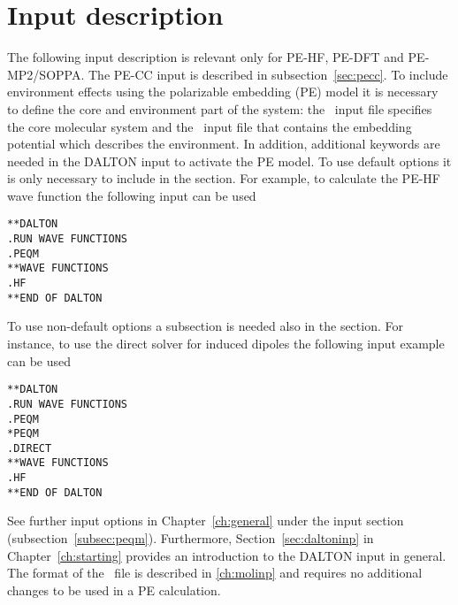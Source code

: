 \section{Input description}
The following input description is relevant only for PE-HF, PE-DFT and PE-MP2/SOPPA. The PE-CC input is described in subsection~\ref{sec:pecc}. To include environment effects using the polarizable embedding (PE) model it is necessary to define the core and environment part of the system: the \mol\ input file specifies the core molecular system and the \pot\ input file that contains the embedding potential which describes the environment. In addition, additional keywords are needed in the DALTON input to activate the PE model. To use default options it is only necessary to include  in the  section. For example, to calculate the PE-HF wave function the following input can be used
\begin{verbatim}
**DALTON
.RUN WAVE FUNCTIONS
.PEQM
**WAVE FUNCTIONS
.HF
**END OF DALTON
\end{verbatim}
To use non-default options a  subsection is needed also in the  section. For instance, to use the direct solver for induced dipoles the following input example can be used
\begin{verbatim}
**DALTON
.RUN WAVE FUNCTIONS
.PEQM
*PEQM
.DIRECT
**WAVE FUNCTIONS
.HF
**END OF DALTON
\end{verbatim}
See further input options in Chapter~\ref{ch:general} under the  input section (subsection~\ref{subsec:peqm}). Furthermore, Section~\ref{sec:daltoninp} in Chapter~\ref{ch:starting} provides an introduction to the DALTON input in general. The format of the \mol\ file is described in \ref{ch:molinp} and requires no additional changes to be used in a PE calculation.

